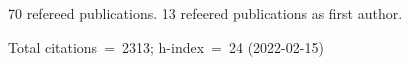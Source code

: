 70 refereed publications. 13 refeered publications as first author.

Total citations~=~2313; h-index~=~24 (2022-02-15)